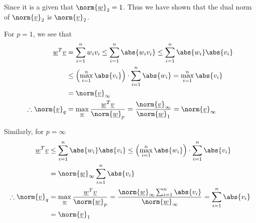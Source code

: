 \begin{enumerate}[label=(\roman*),leftmargin=*,itemsep=0mm]
    Since it is a given that $\norm{\underline{w}}_2 = 1$.  Thus we have shown that the dual norm of $ \norm{\underline{v}}_2$ is $ \norm{\underline{v}}_2$.
    
    For $p=1$, we see that
    \begin{align*}
        \underline{w}^T\underline{v} 
        &= \sum_{i=1}^n w_iv_i 
        \leq \sum_{i=1}^n \abs{w_iv_i}
        \leq \sum_{i=1}^n \abs{w_i}\abs{v_i} \\
        &\leq \left( \max_{i=1}^n \abs{v_i} \right) \cdot \sum_{i=1}^n\abs{w_i}
        = \max_{i=1}^n \abs{v_i} \\
        &= \norm{\underline{v}}_\infty \\
        \therefore \norm{\underline{v}}_q
        &= \max_{\underline{w}} \frac{\underline{w}^T\underline{v}}{\norm{\underline{w}}_p}
        = \frac{\norm{\underline{v}}_\infty}{\norm{\underline{w}}_1}
        = \norm{\underline{v}}_\infty
    \end{align*}
    
    Similarly, for $p=\infty$
    \begin{align*}
        \underline{w}^T\underline{v} 
        &\leq \sum_{i=1}^n \abs{w_i}\abs{v_i}
        \leq \left( \max_{i=1}^n \abs{w_i} \right) \cdot \sum_{i=1}^n\abs{v_i} \\
        &= \norm{\underline{w}}_\infty \sum_{i=1}^n \abs{v_i} \\
        \therefore \norm{\underline{v}}_q
        &= \max_{\underline{w}} \frac{\underline{w}^T\underline{v}}{\norm{\underline{w}}_p}
        = \frac{\norm{\underline{w}}_\infty \sum_{i=1}^n \abs{v_i}}{\norm{\underline{w}}_\infty}
        = \sum_{i=1}^n \abs{v_i} \\
        &= \norm{\underline{v}}_1
    \end{align*}
    
\end{enumerate}